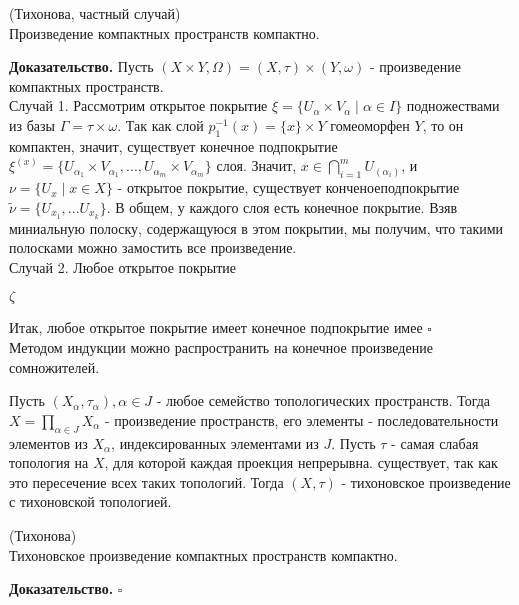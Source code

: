 \begin{theor}
    (Тихонова, частный случай)\\
    Произведение компактных пространств компактно.
\end{theor}
\textbf{Доказательство.} Пусть $(X\times Y,\Omega)=(X,\tau)\times (Y,\omega)$ 
- произведение компактных пространств. \\
Случай 1. Рассмотрим открытое покрытие $\xi=\{U_\alpha\times V_\alpha\mid
\alpha\in I\}$ подножествами из базы $\Gamma=\tau\times \omega$. Так как слой 
$p^{-1}_1(x)=\{x\}\times Y$ гомеоморфен $Y$, то он компактен, значит,
существует конечное подпокрытие $\xi^{(x)}=\{U_{\alpha_1}\times V_{\alpha_1},
...,U_{\alpha_m}\times V_{\alpha_m}\}$ слоя. Значит, 
$x\in \bigcap\limits_{i=1}^m U_(\alpha_i)$, и $\nu=\{U_x\mid x\in X\}$ - 
открытое покрытие, существует конченоеподпокрытие $\tilde\nu=
\{U_{x_1},...U_{x_k}\}$. В общем, у каждого слоя есть конечное покрытие. 
Взяв миниальную полоску, содержащуюся в этом покрытии, мы получим, что
такими полосками можно замостить все произведение. \\
Случай 2. Любое открытое покрытие 

$\zeta$

Итак, любое открытое покрытие имеет конечное подпокрытие имее
$\square$ \\

Методом индукции можно распространить на конечное произведение сомножителей.
\begin{defin}
Пусть $(X_\alpha,\tau_\alpha),\alpha\in J$ - любое семейство топологических
пространств. Тогда
$X=\prod\limits_{\alpha\in J}X_\alpha$ 
- произведение пространств, его элементы - последовательности
элементов из $X_\alpha$, индексированных элементами из $J$. 
Пусть $\tau$ - самая слабая топология на  $X$, для которой каждая
проекция непрерывна. существует,  так как это пересечение всех таких 
топологий. Тогда $(X,\tau)$ - тихоновское произведение с тихоновской
топологией. \end{defin}
\begin{theor}
    (Тихонова)\\
    Тихоновское произведение компактных пространств компактно. 
\end{theor}
\textbf{Доказательство.}  
$\square$ \\



